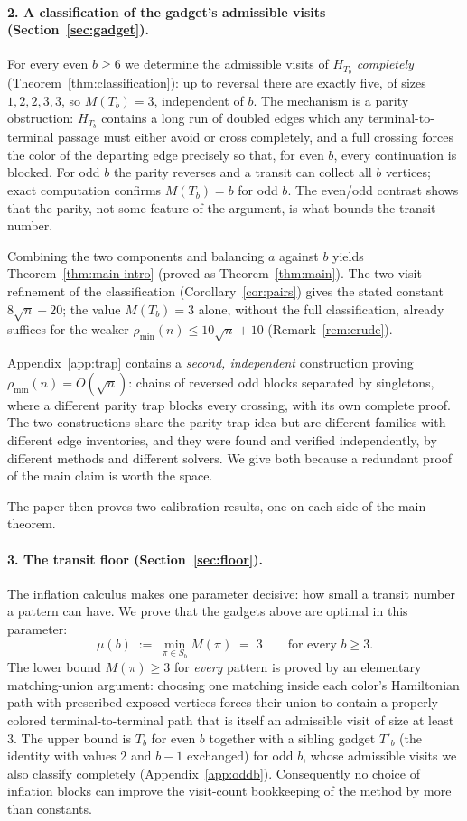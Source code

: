 \documentclass[11pt]{article}
\theoremstyle{definition}
\newcommand{\pmin}{\rho_{\min}}
\begin{document}
\paragraph{2. A classification of the gadget's admissible visits
(Section~\ref{sec:gadget}).}
For every even $b \ge 6$ we determine the admissible visits of $H_{T_b}$
\emph{completely} (Theorem~\ref{thm:classification}): up to reversal there are exactly
five, of sizes $1, 2, 2, 3, 3$, so $M(T_b) = 3$, independent of $b$. The mechanism is a
parity obstruction: $H_{T_b}$ contains a long run of doubled edges which any
terminal-to-terminal passage must either avoid or cross completely, and a full crossing
forces the color of the departing edge precisely so that, for even $b$, every
continuation is blocked. For odd $b$ the parity reverses and a transit can collect all
$b$ vertices; exact computation confirms $M(T_b) = b$ for odd $b$. The even/odd
contrast shows that the parity, not some feature of the argument, is what bounds the
transit number.

Combining the two components and balancing $a$ against $b$ yields
Theorem~\ref{thm:main-intro} (proved as Theorem~\ref{thm:main}). The two-visit
refinement of the classification (Corollary~\ref{cor:pairs}) gives the stated constant
$8\sqrt n + 20$; the value $M(T_b) = 3$ alone, without the full classification, already
suffices for the weaker $\pmin(n) \le 10\sqrt n + 10$ (Remark~\ref{rem:crude}).

Appendix~\ref{app:trap} contains a \emph{second, independent} construction proving
$\pmin(n) = O(\sqrt n)$: chains of reversed odd blocks separated by singletons, where a
different parity trap blocks every crossing, with its own complete proof. The two
constructions share the parity-trap idea but are different families with different edge
inventories, and they were found and verified independently, by different methods and
different solvers. We give both because a redundant proof of the main claim is worth
the space.

The paper then proves two calibration results, one on each side of the main theorem.

\paragraph{3. The transit floor (Section~\ref{sec:floor}).}
The inflation calculus makes one parameter decisive: how small a transit number a
pattern can have. We prove that the gadgets above are optimal in this parameter:
\[
  \mu(b) \;:=\; \min_{\pi \in S_b} M(\pi) \;=\; 3 \qquad \text{for every } b \ge 3 .
\]
The lower bound $M(\pi) \ge 3$ for \emph{every} pattern is proved by an elementary
matching-union argument: choosing one matching inside each color's Hamiltonian path
with prescribed exposed vertices forces their union to contain a properly colored
terminal-to-terminal path that is itself an admissible visit of size at least $3$. The
upper bound is $T_b$ for even $b$ together with a sibling gadget $T'_b$ (the identity
with values $2$ and $b-1$ exchanged) for odd $b$, whose admissible visits we also
classify completely (Appendix~\ref{app:oddb}). Consequently no choice of inflation
blocks can improve the visit-count bookkeeping of the method by more than constants.
\end{document}
